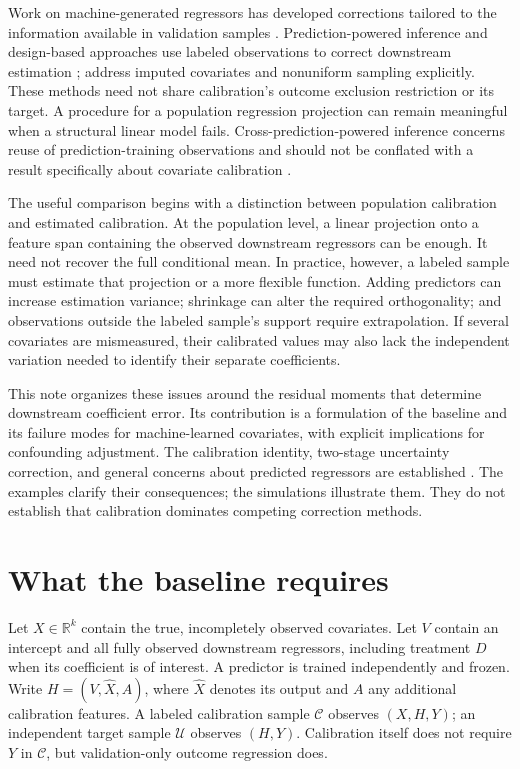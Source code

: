 \documentclass[11pt]{article}
\begin{document}
Work on machine-generated regressors has developed corrections tailored to the information available in validation samples \citep{fong2021,battaglia2025}. Prediction-powered inference and design-based approaches use labeled observations to correct downstream estimation \citep{angelopoulos2023,egami2023}; \citet{kluger2025} address imputed covariates and nonuniform sampling explicitly. These methods need not share calibration's outcome exclusion restriction or its target. A procedure for a population regression projection can remain meaningful when a structural linear model fails. Cross-prediction-powered inference concerns reuse of prediction-training observations and should not be conflated with a result specifically about covariate calibration \citep{zrnic2024cross}.

The useful comparison begins with a distinction between population calibration and estimated calibration. At the population level, a linear projection onto a feature span containing the observed downstream regressors can be enough. It need not recover the full conditional mean. In practice, however, a labeled sample must estimate that projection or a more flexible function. Adding predictors can increase estimation variance; shrinkage can alter the required orthogonality; and observations outside the labeled sample's support require extrapolation. If several covariates are mismeasured, their calibrated values may also lack the independent variation needed to identify their separate coefficients.

This note organizes these issues around the residual moments that determine downstream coefficient error. Its contribution is a formulation of the baseline and its failure modes for machine-learned covariates, with explicit implications for confounding adjustment. The calibration identity, two-stage uncertainty correction, and general concerns about predicted regressors are established \citep{boe2023,haber2021}. The examples clarify their consequences; the simulations illustrate them. They do not establish that calibration dominates competing correction methods.

\section{What the baseline requires}
Let $X\in\mathbb{R}^k$ contain the true, incompletely observed covariates. Let $V$ contain an intercept and all fully observed downstream regressors, including treatment $D$ when its coefficient is of interest. A predictor is trained independently and frozen. Write $H=(V,\widehat X,A)$, where $\widehat X$ denotes its output and $A$ any additional calibration features. A labeled calibration sample $\mathcal C$ observes $(X,H,Y)$; an independent target sample $\mathcal U$ observes $(H,Y)$. Calibration itself does not require $Y$ in $\mathcal C$, but validation-only outcome regression does.
\end{document}
